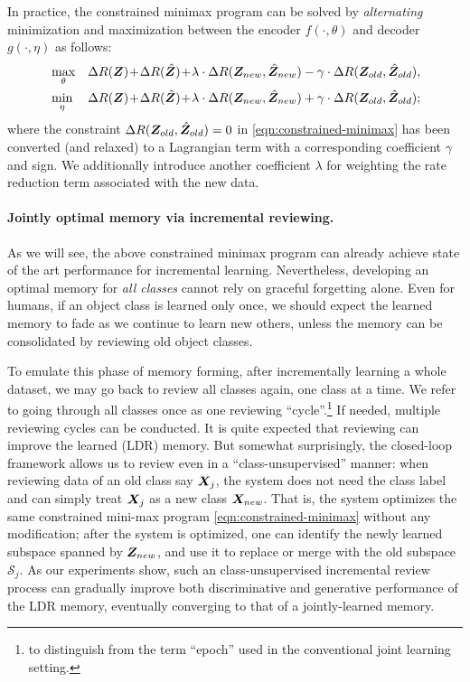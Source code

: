 \documentclass[../../book-main.tex]{subfiles}
\begin{document}
In practice, the constrained minimax program can be solved by {\em alternating}  minimization and maximization between the encoder $f(\cdot, \theta)$ and decoder $g(\cdot, \eta)$ as follows:
\begin{eqnarray}
&\max_\theta  &\Delta{R(\Z)}\!+\!\Delta{R(\hat{\Z})}\!+\!\lambda\cdot  \Delta{R(\Z_{new},\hat{\Z}_{new})} - \gamma\cdot \Delta{R(\Z_{old},\hat{\Z}_{old})}, \label{eqn:relaxed-max}\\ 
&\min_\eta &\Delta{R(\Z)}\!+\!\Delta{R(\hat{\Z})}\!+\!\lambda\cdot \Delta{R(\Z_{new},\hat{\Z}_{new})} + \gamma\cdot \Delta{R(\Z_{old},\hat{\Z}_{old})}; \label{eqn:relaxed-min}
\end{eqnarray}
where the constraint $\Delta R(\bm{Z}_{old},\hat{\bm{Z}}_{old}) = 0$ in \eqref{eqn:constrained-minimax} has been converted (and relaxed) to a Lagrangian term with a corresponding coefficient $\gamma$ and sign. We additionally introduce another coefficient $\lambda$ for weighting the rate reduction term associated with the new data. %



\paragraph{Jointly optimal memory via incremental reviewing.} 
As we will see, the above constrained minimax program can already achieve state of the art performance for incremental learning. Nevertheless, developing an optimal memory for {\em all classes} cannot rely on graceful forgetting alone. Even for humans, if an object class is learned only once, we should expect the learned memory to fade as we continue to learn new others, unless the memory can be consolidated by reviewing old object classes. %

To emulate this phase of memory forming, after incrementally learning a whole dataset, we may go back to review all classes again, one class at a time. We refer to going through all classes once as one reviewing ``cycle''.\footnote{to distinguish from the term ``epoch'' used in the conventional joint learning setting.} If needed, multiple reviewing cycles can be conducted. It is quite expected that reviewing can improve the learned (LDR) memory. But somewhat surprisingly, the closed-loop framework allows us to review even in a ``{class-unsupervised}'' manner: when reviewing data of an old class say $\bm{X}_j$, the system does not need the class label and can simply treat $\bm{X}_j$ as a new class $\bm{X}_{new}$. That is, the system optimizes the same constrained mini-max program \eqref{eqn:constrained-minimax} without any modification; after the system is optimized, one can identify the newly learned subspace spanned by $\bm{Z}_{new}$, and use it to replace or merge with the old subspace $\mathcal{S}_j$. As our experiments show, such an class-unsupervised incremental review process can gradually improve both discriminative and generative performance of the LDR memory, eventually converging to that of a jointly-learned memory.
\end{document}
